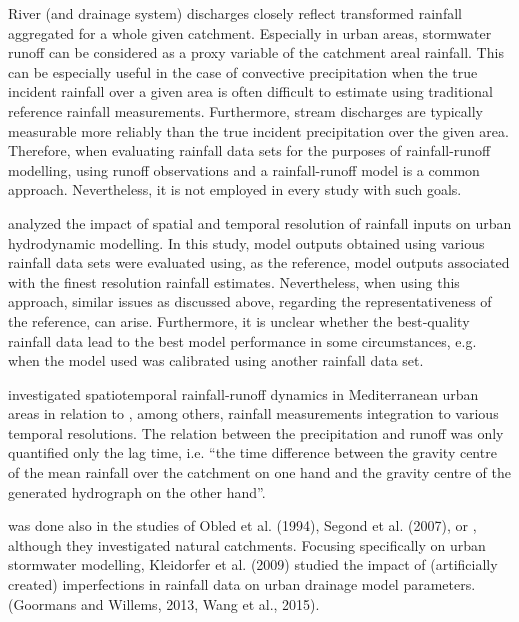 \documentclass{ctuthesis}\usepackage[]{graphicx}\usepackage[]{color}
\begin{document}
River (and drainage system) discharges closely reflect transformed rainfall aggregated for a whole given catchment. Especially in urban areas, stormwater runoff can be considered as a proxy variable of the catchment areal rainfall. This can be especially useful in the case of convective precipitation when the true incident rainfall over a given area is often difficult to estimate using traditional reference rainfall measurements. Furthermore, stream discharges are typically measurable more reliably than the true incident precipitation over the given area. Therefore, when evaluating rainfall data sets for the purposes of rainfall-runoff modelling, using runoff observations and a rainfall-runoff model is a common approach. Nevertheless, it is not employed in every study with such goals. 

\cite{ochoa-rodriguezImpactSpatialTemporal2015} analyzed the impact of spatial and temporal resolution of rainfall inputs on urban hydrodynamic modelling. In this study, model outputs obtained using various rainfall data sets were evaluated using, as the reference, model outputs associated with the finest resolution rainfall estimates. Nevertheless, when using this approach, similar issues as discussed above, regarding the representativeness of the reference, can arise. Furthermore, it is unclear whether the best‐quality rainfall data lead to the best model performance in some circumstances, e.g. when the model used was calibrated using another rainfall data set.

\cite{berneTemporalSpatialResolution2004} investigated spatiotemporal rainfall‐runoff dynamics in Mediterranean urban areas in relation to , among others, rainfall measurements integration to various temporal resolutions. The relation between the precipitation and runoff was only quantified only the lag time, i.e. “the time difference between the gravity centre of the mean rainfall over the catchment on one hand and the gravity centre of the generated hydrograph on the other hand”. 

 was done also in the studies of Obled et al. (1994), Segond et al. (2007), or \citep{sikorskaValueDifferentPrecipitation2018}, although
they investigated natural catchments. Focusing specifically on urban stormwater modelling,
Kleidorfer et al. (2009) studied the impact of (artificially created) imperfections in rainfall data on urban drainage model parameters. (Goormans and Willems, 2013, Wang et al., 2015).
\end{document}
